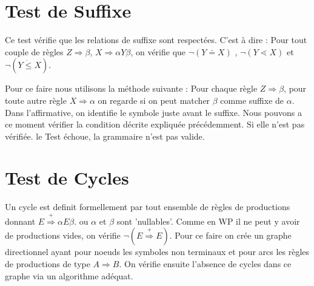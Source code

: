 	\section{Test de Suffixe}
		Ce test vérifie que les relations de suffixe sont respectées. C'est à dire :
		Pour tout couple de règles $Z \Longrightarrow \beta$, $X \Longrightarrow \alpha Y \beta$,
		on vérifie que $\neg(Y \doteq X)$ , $\neg(Y \lessdot X)$ et $\neg(Y \dot{\leq} X)$.
		
		Pour ce faire nous utilisons la méthode suivante : 
		Pour chaque règle $Z \Longrightarrow \beta$, pour toute autre règle $X \Longrightarrow \alpha$ on regarde si on peut matcher $\beta$ 
		comme suffixe de $\alpha$.
		Dans l'affirmative, on identifie le symbole juste avant le suffixe. Nous pouvons a ce moment vérifier la
		condition décrite expliquée précédemment. Si elle n'est pas vérifiée. le Test échoue, la grammaire n'est pas valide.

	\section{Test de Cycles}
		Un cycle est definit formellement par tout ensemble de règles de productions donnant $E \overset{+}{\Longrightarrow} \alpha E\beta$.
		ou $\alpha$ et $\beta$ sont 'nullables'. 
		Comme en WP il ne peut y avoir de productions vides, on vérifie $\neg(E \overset{+}{\Longrightarrow} E)$. Pour ce faire on 
		crée un graphe directionnel ayant pour noeuds les symboles non terminaux et pour arcs les règles de productions de type
		$A\Longrightarrow B$. On vérifie ensuite l'absence de cycles dans ce graphe via un algorithme adéquat.

